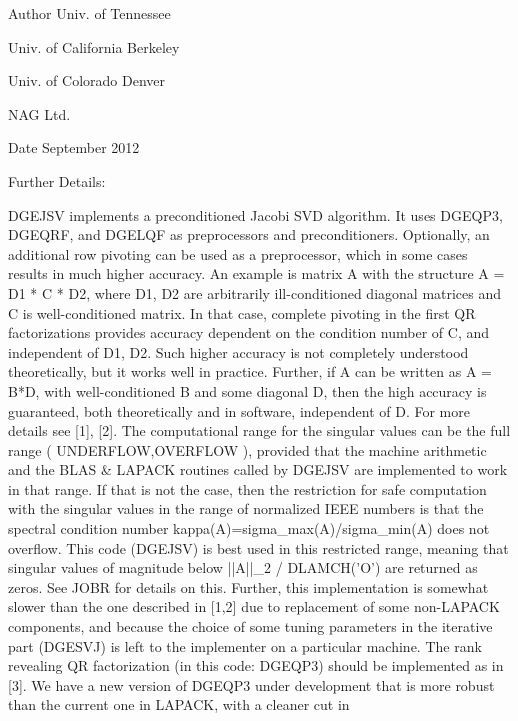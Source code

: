 \begin{DoxyAuthor}{Author}
Univ. of Tennessee 

Univ. of California Berkeley 

Univ. of Colorado Denver 

N\+A\+G Ltd. 
\end{DoxyAuthor}
\begin{DoxyDate}{Date}
September 2012 
\end{DoxyDate}
\begin{DoxyParagraph}{Further Details\+: }
\begin{DoxyVerb}  DGEJSV implements a preconditioned Jacobi SVD algorithm. It uses DGEQP3,
  DGEQRF, and DGELQF as preprocessors and preconditioners. Optionally, an
  additional row pivoting can be used as a preprocessor, which in some
  cases results in much higher accuracy. An example is matrix A with the
  structure A = D1 * C * D2, where D1, D2 are arbitrarily ill-conditioned
  diagonal matrices and C is well-conditioned matrix. In that case, complete
  pivoting in the first QR factorizations provides accuracy dependent on the
  condition number of C, and independent of D1, D2. Such higher accuracy is
  not completely understood theoretically, but it works well in practice.
  Further, if A can be written as A = B*D, with well-conditioned B and some
  diagonal D, then the high accuracy is guaranteed, both theoretically and
  in software, independent of D. For more details see [1], [2].
     The computational range for the singular values can be the full range
  ( UNDERFLOW,OVERFLOW ), provided that the machine arithmetic and the BLAS
  & LAPACK routines called by DGEJSV are implemented to work in that range.
  If that is not the case, then the restriction for safe computation with
  the singular values in the range of normalized IEEE numbers is that the
  spectral condition number kappa(A)=sigma_max(A)/sigma_min(A) does not
  overflow. This code (DGEJSV) is best used in this restricted range,
  meaning that singular values of magnitude below ||A||_2 / DLAMCH('O') are
  returned as zeros. See JOBR for details on this.
     Further, this implementation is somewhat slower than the one described
  in [1,2] due to replacement of some non-LAPACK components, and because
  the choice of some tuning parameters in the iterative part (DGESVJ) is
  left to the implementer on a particular machine.
     The rank revealing QR factorization (in this code: DGEQP3) should be
  implemented as in [3]. We have a new version of DGEQP3 under development
  that is more robust than the current one in LAPACK, with a cleaner cut in

\end{DoxyVerb}
\end{DoxyParagraph}
